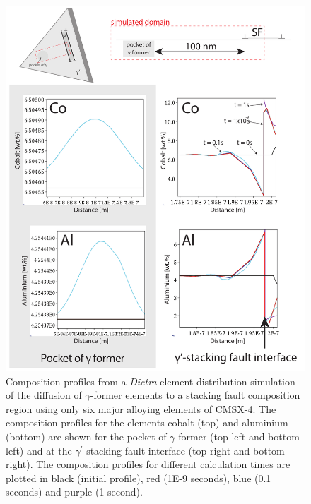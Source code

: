 \documentclass[a4paper,12pt,times,numbered,print,index]{Classes/PhDThesisPSnPDF}
\begin{document}
\begin{figure}
    \centering
    \includegraphics[width=\textwidth,keepaspectratio]{Figures/dictra_simul_1.pdf}
    \caption{Composition profiles from a \textit{Dictra} element distribution simulation of the diffusion of $\gamma$-former elements to a stacking fault composition region using only six major alloying elements of CMSX-4. The composition profiles for the elements cobalt (top) and aluminium (bottom) are shown for the pocket of $\gamma$ former (top left and bottom left) and at the $\gamma^\prime$-stacking fault interface (top right and bottom right). The composition profiles for different calculation times are plotted in black (initial profile), red (1E-9 seconds), blue (0.1 seconds) and purple (1 second).}
    \label{fig:dictra}
\end{figure}
\end{document}
